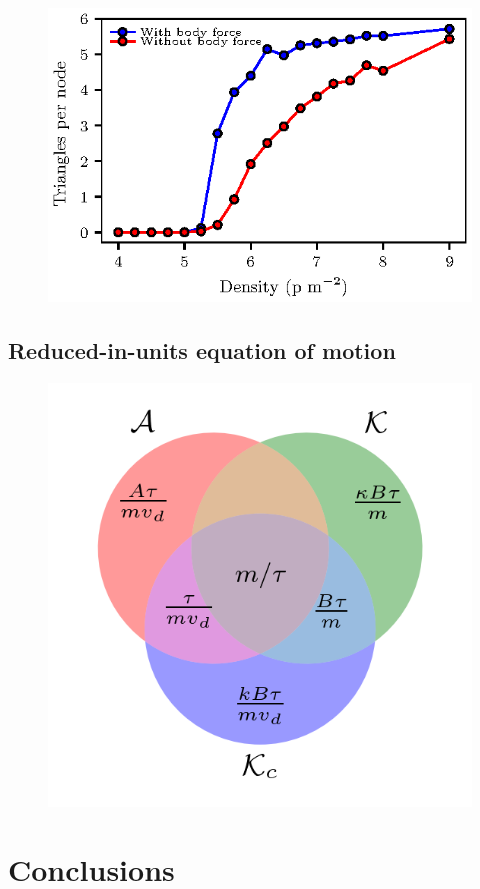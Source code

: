 \documentclass[preprint,12pt]{elsarticle}
\begin{document}
\begin{figure}[htbp!]
\centering
\includegraphics[width=0.7\columnwidth]
{./triangles.eps}
\caption{\label{} }
\end{figure}




\subsection{\label{reduced-in-units} Reduced-in-units equation of motion}


\begin{figure}[htbp!]
\centering
\includegraphics[width=0.7\columnwidth]
{./venn_parameters.png}
\caption{\label{} }
\end{figure}






\section{\label{conclusions}Conclusions}
\end{document}
